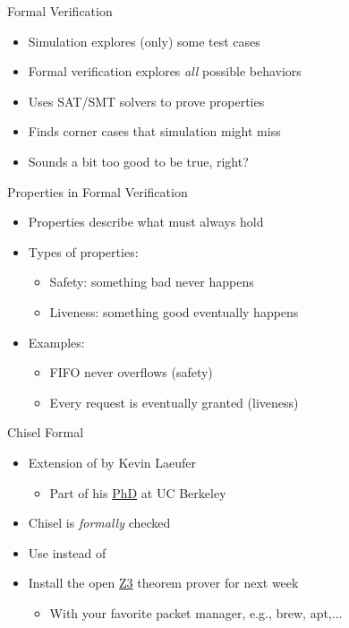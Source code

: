 \begin{frame}[fragile]{Formal Verification}
\begin{itemize}
\item Simulation explores (only) some test cases
\item Formal verification explores \emph{all} possible behaviors
\item Uses SAT/SMT solvers to prove properties
\item Finds corner cases that simulation might miss
\item Sounds a bit too good to be true, right?
\end{itemize}
\end{frame}

\begin{frame}{Properties in Formal Verification}
\begin{itemize}
    \item Properties describe what must always hold
    \item Types of properties:
    \begin{itemize}
        \item Safety: something bad never happens
        \item Liveness: something good eventually happens
    \end{itemize}
    \item Examples:
    \begin{itemize}
        \item FIFO never overflows (safety)
        \item Every request is eventually granted (liveness)
    \end{itemize}
\end{itemize}
\end{frame}


\begin{frame}[fragile]{Chisel Formal}
\begin{itemize}
\item Extension of  by Kevin Laeufer
\begin{itemize}
\item Part of his \href{https://www2.eecs.berkeley.edu/Pubs/TechRpts/2024/EECS-2024-157.pdf}{PhD} at UC Berkeley
\end{itemize}
\item Chisel  is \emph{formally} checked
\item Use  instead of 
\item Install the open \href{https://github.com/Z3Prover/z3}{Z3} theorem prover for next week
\begin{itemize}
\item With your favorite packet manager, e.g., brew, apt,...
\end{itemize}
\end{itemize}
\end{frame}

